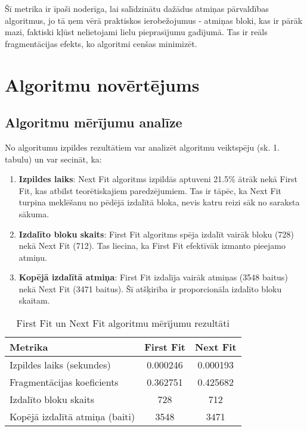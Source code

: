 \documentclass{report}
\begin{document}
	Šī metrika ir īpaši noderīga, lai salīdzinātu dažādus atmiņas pārvaldības algoritmus, jo tā ņem vērā praktiskos ierobežojumus - atmiņas bloki, kas ir pārāk mazi, faktiski kļūst nelietojami lielu pieprasījumu gadījumā. Tas ir reāls fragmentācijas efekts, ko algoritmi cenšas minimizēt.
	
	\section{Algoritmu novērtējums}
	
	\subsection{Algoritmu mērījumu analīze}
	
	No algoritumu izpildes rezultātiem var analizēt algoritmu veiktspēju (sk. 1. tabulu) un var secināt, ka:
	
	\begin{enumerate}
		\item \textbf{Izpildes laiks}: Next Fit algoritms izpildās aptuveni 21.5\% ātrāk nekā First Fit, kas atbilst teorētiskajiem paredzējumiem. Tas ir tāpēc, ka Next Fit turpina meklēšanu no pēdējā izdalītā bloka, nevis katru reizi sāk no saraksta sākuma.
		
		\item \textbf{Izdalīto bloku skaits}: First Fit algoritms spēja izdalīt vairāk bloku (728) nekā Next Fit (712). Tas liecina, ka First Fit efektīvāk izmanto pieejamo atmiņu.
		
		\item \textbf{Kopējā izdalītā atmiņa}: First Fit izdalīja vairāk atmiņas (3548 baitus) nekā Next Fit (3471 baitus). Šī atšķirība ir proporcionāla izdalīto bloku skaitam.
	\end{enumerate}

	
	\begin{table}[h]
		\centering
		\begin{tabular}{lcc}
			\toprule
			\textbf{Metrika} & \textbf{First Fit} & \textbf{Next Fit} \\
			\midrule
			Izpildes laiks (sekundes) & 0.000246 & 0.000193 \\
			Fragmentācijas koeficients & 0.362751 & 0.425682 \\
			Izdalīto bloku skaits & 728 & 712 \\
			Kopējā izdalītā atmiņa (baiti) & 3548 & 3471 \\
			\bottomrule
		\end{tabular}
		\caption{First Fit un Next Fit algoritmu mērījumu rezultāti}
		\label{tab:performance}
	\end{table}
\end{document}
